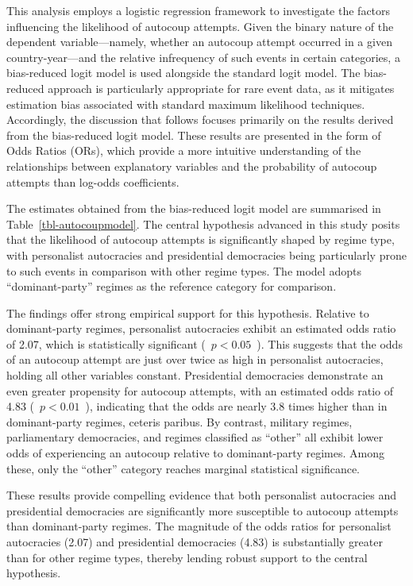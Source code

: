 \documentclass[
  12pt,
]{report}
\begin{document}
This analysis employs a logistic regression framework to investigate the
factors influencing the likelihood of autocoup attempts. Given the
binary nature of the dependent variable---namely, whether an autocoup
attempt occurred in a given country-year---and the relative infrequency
of such events in certain categories, a bias-reduced logit model is used
alongside the standard logit model. The bias-reduced approach is
particularly appropriate for rare event data, as it mitigates estimation
bias associated with standard maximum likelihood techniques.
Accordingly, the discussion that follows focuses primarily on the
results derived from the bias-reduced logit model. These results are
presented in the form of Odds Ratios (ORs), which provide a more
intuitive understanding of the relationships between explanatory
variables and the probability of autocoup attempts than log-odds
coefficients.

The estimates obtained from the bias-reduced logit model are summarised
in Table~\ref{tbl-autocoupmodel}. The central hypothesis advanced in
this study posits that the likelihood of autocoup attempts is
significantly shaped by regime type, with personalist autocracies and
presidential democracies being particularly prone to such events in
comparison with other regime types. The model adopts ``dominant-party''
regimes as the reference category for comparison.

The findings offer strong empirical support for this hypothesis.
Relative to dominant-party regimes, personalist autocracies exhibit an
estimated odds ratio of 2.07, which is statistically significant (\,
\(p<0.05\) \,). This suggests that the odds of an autocoup attempt are
just over twice as high in personalist autocracies, holding all other
variables constant. Presidential democracies demonstrate an even greater
propensity for autocoup attempts, with an estimated odds ratio of 4.83 (
\,\(p<0.01\) \,), indicating that the odds are nearly 3.8 times higher
than in dominant-party regimes, ceteris paribus. By contrast, military
regimes, parliamentary democracies, and regimes classified as ``other''
all exhibit lower odds of experiencing an autocoup relative to
dominant-party regimes. Among these, only the ``other'' category reaches
marginal statistical significance.

These results provide compelling evidence that both personalist
autocracies and presidential democracies are significantly more
susceptible to autocoup attempts than dominant-party regimes. The
magnitude of the odds ratios for personalist autocracies (2.07) and
presidential democracies (4.83) is substantially greater than for other
regime types, thereby lending robust support to the central hypothesis.
\end{document}
